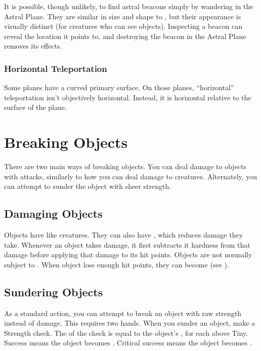       It is possible, though unlikely, to find astral beacons simply by wandering in the Astral Plane.
      They are similar in size and shape to , but their appearance is visually distinct (for creatures who can see  objects).
      Inspecting a beacon can reveal the location it points to, and destroying the beacon in the Astral Plane removes its effects.

    \subsubsection{Horizontal Teleportation}
      Some planes have a curved primary surface.
      On those planes, ``horizontal'' teleportation isn't objectively horizontal.
      Instead, it is horizontal relative to the surface of the plane.

\section{Breaking Objects}
  There are two main ways of breaking objects.
  You can deal damage to objects with attacks, similarly to how you can deal damage to creatures.
  Alternately, you can attempt to sunder the object with sheer strength.

  \subsection{Damaging Objects}
    Objects have  like creatures.
    They can also have , which reduces damage they take.
    Whenever an object takes damage, it first subtracts it hardness from that damage before applying that damage to its hit points.
    Objects are not normally subject to .
    When object lose enough hit points, they can become  (see ).

  \subsection{Sundering Objects}
    As a standard action, you can attempt to break an object with raw strength instead of damage.
    This requires two hands.
    When you sunder an object, make a Strength check.
    The  of the check is equal to the object's ,  for each  above Tiny.
    Success means the object becomes .
    Critical success means the object becomes .

